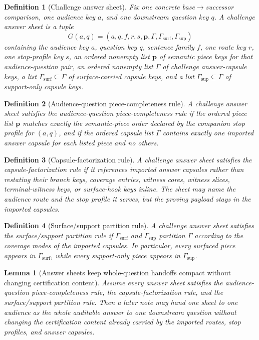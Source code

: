 \documentclass[11pt]{article}
\newtheorem{definition}{Definition}
\newtheorem{lemma}{Lemma}
\begin{document}
\begin{definition}[Challenge answer sheet]
Fix one concrete base$\to$successor comparison, one audience key $a$, and one downstream question key $q$.
A \emph{challenge answer sheet} is a tuple
\[
G(a,q)=(a,q,f,r,s,\mathbf{p},\Gamma,\Gamma_{\mathrm{surf}},\Gamma_{\mathrm{sup}})
\]
containing the audience key $a$, question key $q$, sentence family $f$, one route key $r$, one stop-profile key $s$, an ordered nonempty list $\mathbf{p}$ of semantic piece keys for that audience-question pair, an ordered nonempty list $\Gamma$ of challenge answer-capsule keys, a list $\Gamma_{\mathrm{surf}}\subseteq \Gamma$ of surface-carried capsule keys, and a list $\Gamma_{\mathrm{sup}}\subseteq \Gamma$ of support-only capsule keys.
\end{definition}

\begin{definition}[Audience-question piece-completeness rule]
A challenge answer sheet satisfies the \emph{audience-question piece-completeness rule} if the ordered piece list $\mathbf{p}$ matches exactly the semantic-piece order declared by the companion stop profile for $(a,q)$, and if the ordered capsule list $\Gamma$ contains exactly one imported answer capsule for each listed piece and no others.
\end{definition}

\begin{definition}[Capsule-factorization rule]
A challenge answer sheet satisfies the \emph{capsule-factorization rule} if it references imported answer capsules rather than restating their branch keys, coverage entries, witness cores, witness slices, terminal-witness keys, or surface-hook keys inline.
The sheet may name the audience route and the stop profile it serves, but the proving payload stays in the imported capsules.
\end{definition}

\begin{definition}[Surface/support partition rule]
A challenge answer sheet satisfies the \emph{surface/support partition rule} if $\Gamma_{\mathrm{surf}}$ and $\Gamma_{\mathrm{sup}}$ partition $\Gamma$ according to the coverage modes of the imported capsules.
In particular, every surfaced piece appears in $\Gamma_{\mathrm{surf}}$, while every support-only piece appears in $\Gamma_{\mathrm{sup}}$.
\end{definition}

\begin{lemma}[Answer sheets keep whole-question handoffs compact without changing certification content]
Assume every answer sheet satisfies the audience-question piece-completeness rule, the capsule-factorization rule, and the surface/support partition rule.
Then a later note may hand one sheet to one audience as the whole auditable answer to one downstream question without changing the certification content already carried by the imported routes, stop profiles, and answer capsules.
\end{lemma}
\end{document}
